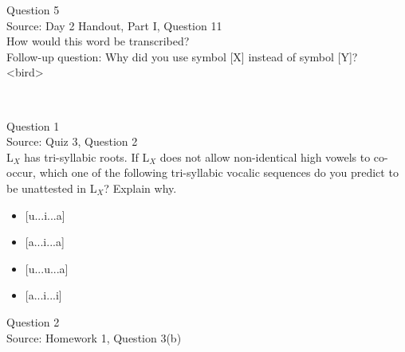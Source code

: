 \documentclass[12pt]{article}
\begin{document}
\newpage

{\large Question 5}\\

Source: Day 2 Handout, Part I, Question 11\\

How would this word be transcribed?\\ Follow-up question: Why did you use symbol [X] instead of symbol [Y]?\\

<bird>


\newpage

\begin{center}
\textbf{{\color{red}{\HUGE END OF EXAM}}}\\

\end{center}
\newpage

\begin{center}
\textbf{{\color{blue}{\HUGE START OF EXAM\\}}}

\textbf{{\color{blue}{\HUGE Student ID: 2358\\}}}

\textbf{{\color{blue}{\HUGE 4:15 - 4:30 PM\\}}}

\end{center}
\newpage

{\large Question 1}\\

Source: Quiz 3, Question 2\\

L$_X$ has tri-syllabic roots. If L$_X$ does not allow non-identical high vowels to co-occur, which one of the following tri-syllabic vocalic sequences do you predict to be unattested in L$_X$? Explain why.\\

\begin{itemize} \item {[u...i...a]} \item {[a...i...a]} \item {[u...u...a]} \item {[a...i...i]} \end{itemize}


\newpage

{\large Question 2}\\

Source: Homework 1, Question 3(b)\\
\end{document}
